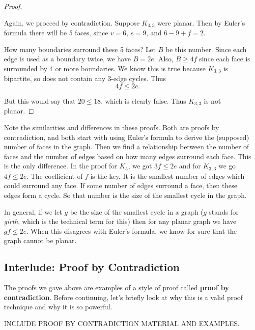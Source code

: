 \documentclass[10pt,]{book}
\newcommand{\terminology}[1]{\textbf{#1}}
\theoremstyle{plain}
\theoremstyle{definition}
\theoremstyle{definition}
\theoremstyle{definition}
\theoremstyle{definition}
\numberwithin{equation}{chapter}
\begin{document}
\begin{proof}\hypertarget{proof-6}{}
\hypertarget{p-256}{}%
Again, we proceed by contradiction. Suppose \(K_{3,3}\) were planar. Then by Euler's formula there will be 5 faces, since \(v = 6\), \(e = 9\), and \(6 - 9 + f = 2\).%
\par
\hypertarget{p-257}{}%
How many boundaries surround these 5 faces? Let \(B\) be this number. Since each edge is used as a boundary twice, we have \(B = 2e\). Also, \(B \ge 4f\) since each face is surrounded by 4 or more boundaries. We know this is true because \(K_{3,3}\) is bipartite, so does not contain any 3-edge cycles. Thus%
\begin{equation*}
4f \le 2e.
\end{equation*}
%
\par
\hypertarget{p-258}{}%
But this would say that \(20 \le 18\), which is clearly false. Thus \(K_{3,3}\) is not planar.%
\end{proof}
\hypertarget{p-259}{}%
Note the similarities and differences in these proofs. Both are proofs by contradiction, and both start with using Euler's formula to derive the (supposed) number of faces in the graph. Then we find a relationship between the number of faces and the number of edges based on how many edges surround each face. This is the only difference. In the proof for \(K_5\), we got \(3f \le 2e\) and for \(K_{3,3}\) we go \(4f \le 2e\). The coefficient of \(f\) is the key. It is the smallest number of edges which could surround any face. If some number of edges surround a face, then these edges form a cycle. So that number is the size of the smallest cycle in the graph.%
\par
\hypertarget{p-260}{}%
In general, if we let \(g\) be the size of the smallest cycle in a graph (\(g\) stands for \emph{girth}, which is the technical term for this) then for any planar graph we have \(gf \le 2e\). When this disagrees with Euler's formula, we know for sure that the graph cannot be planar.%
\typeout{************************************************}
\typeout{************************************************}
\subsection[{Interlude: Proof by Contradiction}]{Interlude: Proof by Contradiction}\label{subsection-8}
\hypertarget{p-261}{}%
The proofs we gave above are examples of a style of proof called \terminology{proof by contradiction}.  Before continuing, let's briefly look at why this is a valid proof technique and why it is so powerful.%
\par
\hypertarget{p-262}{}%
INCLUDE PROOF BY CONTRADICTION MATERIAL AND EXAMPLES.%
\typeout{************************************************}
\typeout{************************************************}
\end{document}
